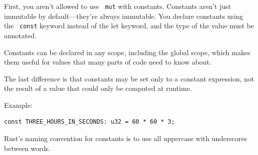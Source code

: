 \documentclass[11pt]{article}
\let\OldTexttt\texttt
\renewcommand{\texttt}[1]{\OldTexttt{\color{MidnightBlue} #1}}
\begin{document}
First, you aren’t allowed to use \texttt{mut} with constants. Constants aren’t just immutable by
default—they’re always immutable. You declare constants using the \texttt{const} keyword instead of the
let keyword, and the type of the value must be annotated.

Constants can be declared in any scope, including the global scope, which makes them useful for
values that many parts of code need to know about.

The last difference is that constants may be set only to a constant expression, not the result
of a value that could only be computed at runtime.

Example:
\begin{verbatim}
const THREE_HOURS_IN_SECONDS: u32 = 60 * 60 * 3;
\end{verbatim}

Rust’s naming convention for constants is to use all uppercase with underscores between words.
\end{document}
